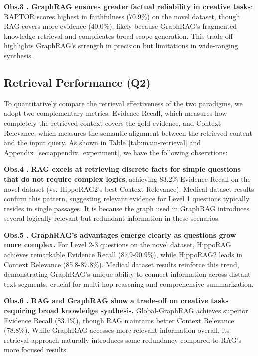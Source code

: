 \documentclass{article} %
\begin{document}
\textbf{Obs.3 . GraphRAG ensures greater factual reliability in creative tasks}: RAPTOR scores highest in faithfulness (70.9\%) on the novel dataset, though RAG covers more evidence (40.0\%), likely because GraphRAG’s fragmented knowledge retrieval and complicates broad scope generation. This trade-off highlights GraphRAG’s strength in precision but limitations in wide-ranging synthesis.

\subsection{Retrieval Performance (Q2)}

To quantitatively compare the retrieval effectiveness of the two paradigms, we adopt two complementary metrics: Evidence Recall, which measures how completely the retrieved context covers the gold evidence, and Context Relevance, which measures the semantic alignment between the retrieved content and the input query. As shown in Table~\ref{tab:main-retrieval} and Appendix~\ref{sec:appendix_experiment}, we have the following observtions:

\textbf{Obs.4 .} \textbf{RAG excels at retrieving discrete facts for simple questions that do not require complex logics}, achieving 83.2\% Evidence Recall on the novel dataset (vs. HippoRAG2's best Context Relevance). Medical dataset results confirm this pattern, suggesting relevant evidence for Level 1 questions typically resides in single passages. It is because the graph used in GraphRAG introduces several logically relevant but redundant information in these scenarios.

\textbf{Obs.5 .} \textbf{GraphRAG's advantages emerge clearly as questions grow more complex.} For Level 2-3 questions on the novel dataset, HippoRAG achieves remarkable Evidence Recall (87.9-90.9\%), while HippoRAG2 leads in Context Relevance (85.8-87.8\%). Medical dataset results reinforce this trend, demonstrating GraphRAG's unique ability to connect information across distant text segments, crucial for multi-hop reasoning and comprehensive summarization.

\textbf{Obs.6 .} \textbf{RAG and GraphRAG show a trade-off on creative tasks requiring broad knowledge synthesis.} Global-GraphRAG achieves superior Evidence Recall (83.1\%), though RAG maintains better Context Relevance (78.8\%). While GraphRAG accesses more relevant information overall, its retrieval approach naturally introduces some redundancy compared to RAG's more focused results.
\end{document}
